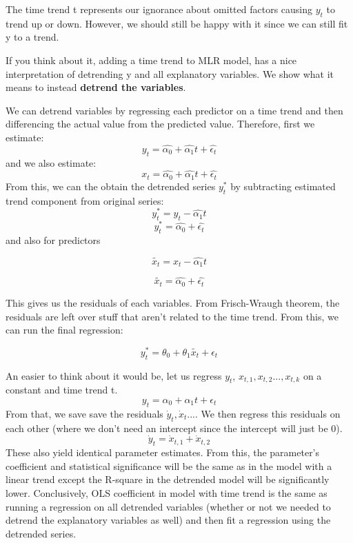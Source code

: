 \documentclass[11pt, oneside]{article}
\theoremstyle{definition}
\begin{document}
The time trend t represents our ignorance about omitted factors causing $y_t$ to trend up or down. However, we should still be happy with it since we can still fit y to a trend.


If you think about it, adding a time trend to MLR model, has a nice interpretation of detrending y and all explanatory variables. We show what it means to instead \textbf{detrend the variables}.

We can detrend variables by regressing each predictor on a time trend and then differencing the actual value from the predicted value. Therefore, first we estimate:
$$
y_t = \hat{\alpha_0} + \hat{\alpha_1}t + \hat{\epsilon_t}
$$
and we also estimate:
$$
x_t = \hat{\alpha_0} + \hat{\alpha_1}t + \hat{\epsilon_t}
$$
From this, we can the obtain the detrended series $y_t^*$ by subtracting estimated trend component from original series:
$$
y_t^* = y_t - \hat{\alpha_1}t
$$
$$
y_t^{*} = \hat{\alpha_0} + \hat{\epsilon_t}
$$
and also for predictors

$$
\tilde{x_t} = x_t - \hat{\alpha_{1}} t
$$

$$
\tilde{x_{t}} = \hat{\alpha_0} + \hat{\epsilon_t}
$$

This gives us the residuals of each variables. From Frisch-Wraugh theorem, the residuals are left over stuff that aren't related to the time trend. From this, we can run the final regression:

$$
y_t^{*} = \theta_0 + \theta_1\tilde{x_t} + \epsilon_t
$$

An easier to think about it would be, let us regress $y_t$, $x_{t,1},x_{t,2}...,x_{t,k}$ on a constant and time trend t.
$$
y_t = \alpha_0 + \alpha_1t + \epsilon_t
$$ From that, we save save the residuals $\dot{y}_t, \dot{x}_t ...$. We then regress this residuals on each other (where we don't need an intercept since the intercept will just be 0).
$$
\dot{y}_t = \dot{x}_{t,1} + \dot{x}_{t,2}
$$
These also yield identical parameter estimates. From this, the parameter's coefficient and statistical significance will be the same as in the model with a linear trend except the R-square in the detrended model will be significantly lower. Conclusively, OLS coefficient in model with time trend is the same as running a regression on all detrended variables (whether or not we needed to detrend the explanatory variables as well) and then fit a regression using the detrended series.
\end{document}
